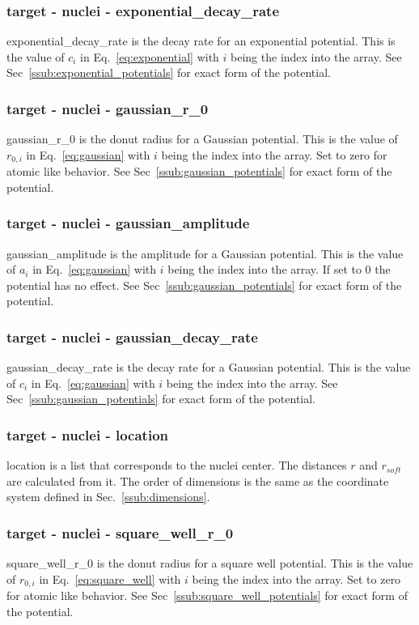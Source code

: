 \documentclass{article}
\begin{document}
\subsubsection{target - nuclei - exponential\_decay\_rate}
exponential\_decay\_rate is the decay rate for an exponential potential. This is the value of $c_i$ in Eq.~\ref{eq:exponential} with $i$ being the index into the array. See Sec~\ref{ssub:exponential_potentials} for exact form of the potential.

\subsubsection{target - nuclei - gaussian\_r\_0}
gaussian\_r\_0 is the donut radius for a Gaussian potential. This is the value of $r_{0,i}$ in Eq.~\ref{eq:gaussian} with $i$ being the index into the array. Set to zero for atomic like behavior. See Sec~\ref{ssub:gaussian_potentials} for exact form of the potential.

\subsubsection{target - nuclei - gaussian\_amplitude}
gaussian\_amplitude is the amplitude for a Gaussian potential. This is the value of $a_i$ in Eq.~\ref{eq:gaussian} with $i$ being the index into the array. If set to 0 the potential has no effect. See Sec~\ref{ssub:gaussian_potentials} for exact form of the potential.

\subsubsection{target - nuclei - gaussian\_decay\_rate}
gaussian\_decay\_rate is the decay rate for a Gaussian potential. This is the value of $c_i$ in Eq.~\ref{eq:gaussian} with $i$ being the index into the array. See Sec~\ref{ssub:gaussian_potentials} for exact form of the potential.

\subsubsection{target - nuclei - location}
location is a list that corresponds to the nuclei center. The distances $r$ and $r_{soft}$ are calculated from it. The order of dimensions is the same as the coordinate system defined in Sec.~\ref{ssub:dimensions}.

\subsubsection{target - nuclei - square\_well\_r\_0}
square\_well\_r\_0 is the donut radius for a square well potential. This is the value of $r_{0,i}$ in Eq.~\ref{eq:square_well} with $i$ being the index into the array. Set to zero for atomic like behavior. See Sec~\ref{ssub:square_well_potentials} for exact form of the potential.
\end{document}
